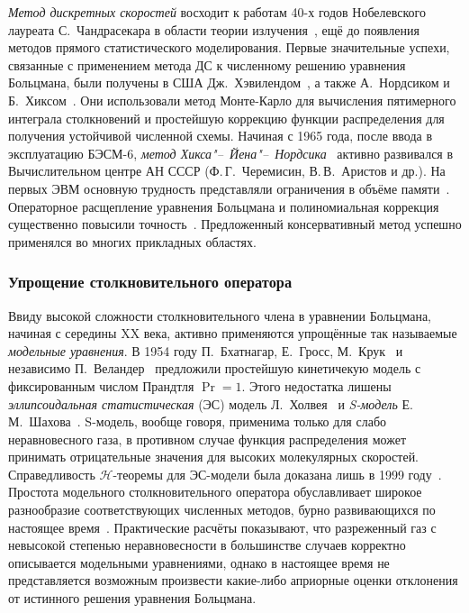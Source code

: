 \emph{Метод дискретных скоростей} восходит к работам 40-х годов Нобелевского лауреата С.~Чандрасекара
в области теории излучения~\cite{Chandrasekhar1950}, ещё до появления методов прямого статистического моделирования.
Первые значительные успехи, связанные с применением метода ДС к численному решению уравнения Больцмана,
были получены в США Дж.~Хэвилендом~\cite{Haviland1965, Haviland1970}, а также А.~Нордсиком и Б.~Хиксом~\cite{Nordsieck1966, Nordsieck1970}.
Они использовали метод Монте-Карло для вычисления пятимерного интеграла столкновений
и простейшую коррекцию функции распределения для получения устойчивой численной схемы.
Начиная с 1965 года, после ввода в эксплуатацию БЭСМ-6, \emph{метод Хикса"--~Йена"--~Нордсика}~\cite{Nordsieck1966, Yen1984}
активно развивался в Вычислительном центре АН СССР (Ф.\,Г.~Черемисин, В.\,В.~Аристов и др.).
На первых ЭВМ основную трудность представляли ограничения в объёме памяти~\cite{Tcheremissine1970}.
Операторное расщепление уравнения Больцмана и полиномиальная коррекция существенно повысили точность~\cite{Tcheremissine1980}.
Предложенный консервативный метод успешно применялся во многих прикладных областях.

\subsubsection{Упрощение столкновительного оператора}

Ввиду высокой сложности столкновительного члена в уравнении Больцмана, начиная с середины XX века,
активно применяются упрощённые так называемые \emph{модельные уравнения}.
В 1954 году П.~Бхатнагар, Е.~Гросс, М.~Крук~\cite{Krook1954} и независимо П.~Веландер~\cite{Welander1954}
предложили простейшую кинетичекую модель с фиксированным числом Прандтля \(\Pr=1\).
Этого недостатка лишены \emph{эллипсоидальная статистическая} (ЭС) модель Л.~Холвея~\cite{Holway1963, Holway1966}
и \emph{S-модель} Е.\,М.~Шахова~\cite{Shakhov1968}.
S-модель, вообще говоря, применима только для слабо неравновесного газа,
в противном случае функция распределения может принимать отрицательные значения для высоких молекулярных скоростей.
Справедливость \(\mathcal{H}\)-теоремы для ЭС-модели была доказана лишь в 1999 году~\cite{Perthame2000}.
Простота модельного столкновительного оператора обуславливает широкое разнообразие соответствующих численных методов,
бурно развивающихся по настоящее время~\cite{Dimarco2014}.
Практические расчёты показывают, что разреженный газ с невысокой степенью неравновесности в большинстве случаев
корректно описывается модельными уравнениями, однако в настоящее время не представляется возможным произвести какие-либо
априорные оценки отклонения от истинного решения уравнения Больцмана.

